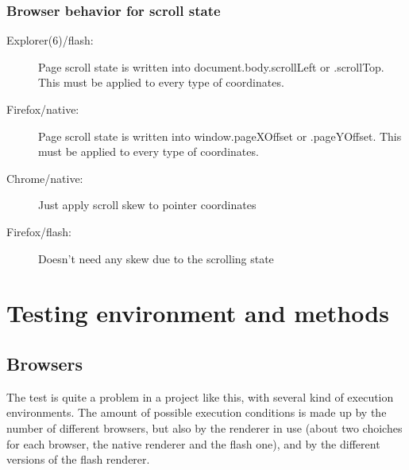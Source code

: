 \documentclass[10pt,a4paper,english]{book}
\begin{document}

\hypertarget{browser-behavior-for-scroll-state}{}
\subsection{Browser behavior for scroll state}
\label{browser-behavior-for-scroll-state}
\begin{description}
\item[{Explorer(6)/flash:}] \leavevmode 
Page scroll state is written into document.body.scrollLeft or
.scrollTop. This must be applied to every type of coordinates.

\item[{Firefox/native:}] \leavevmode 
Page scroll state is written into window.pageXOffset or
.pageYOffset. This must be applied to every type of coordinates.

\item[{Chrome/native:}] \leavevmode 
Just apply scroll skew to pointer coordinates

\item[{Firefox/flash:}] \leavevmode 
Doesn't need any skew due to the scrolling state

\end{description}



\hypertarget{testing-environment-and-methods}{}
\chapter{Testing environment and methods}
\label{testing-environment-and-methods}



\hypertarget{browsers}{}
\section{Browsers}
\label{browsers}

The test is quite a problem in a project like this, with several kind
of execution environments. The amount of possible execution conditions
is made up by the number of different browsers, but also by the
renderer in use (about two choiches for each browser, the native
renderer and the flash one), and by the different versions of the
flash renderer.
\end{document}
